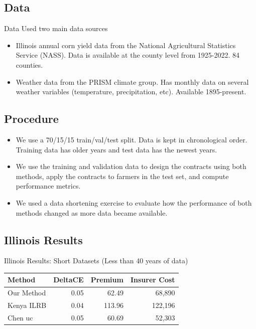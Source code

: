 \documentclass{beamer}
\begin{document}
\subsection{Data}
\begin{frame}{Data}
    Used two main data sources
    \begin{itemize}
        \setlength\itemsep{2em}
        \item Illinois annual corn yield data from the National Agricultural Statistics Service (NASS). Data is available at the county level from 1925-2022. 84 counties. 
        \item Weather data from the PRISM climate group. Has monthly data on several weather variables (temperature, precipitation, etc). Available 1895-present.
    \end{itemize}
\end{frame}

\subsection{Procedure}
\begin{frame}
    \begin{itemize}
        \setlength\itemsep{2em}
        \item We use a 70/15/15 train/val/test split. Data is kept in chronological order. Training data has older years and test data has the newest years. 
        \item We use the training and validation data to design the contracts using both methods, apply the contracts to farmers in the test set, and compute performance metrics. 
        \item We used a data shortening exercise to evaluate how the performance of both methods changed as more data became available. 
    \end{itemize}
\end{frame}

\subsection*{Illinois Results}
\begin{frame}{Illinois Results: Short Datasets (Less than 40 years of data)}
    \begin{table}
        \begin{tabular}{lrrr}
            \toprule
                  Method &  DeltaCE &  Premium &  Insurer Cost \\
            \midrule
            Our Method &     0.05 &    62.49 &             68,890 \\
               Kenya ILRB &     0.04 &   113.96 &            122,196 \\
                 Chen uc &     0.05 &    60.69 &            52,303 \\
            \bottomrule
            \end{tabular}
    \end{table}
\end{frame}
\end{document}
